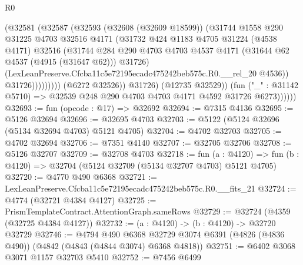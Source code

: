 \begin{lexlean}{R0}
\begin{coremodule}
                              (@32581
                                (@32587
                                  (@32593
                                    (@32608 (@32609 @18599))
                                    (@31744
                                      @1558
                                      @290
                                      @31225
                                      @4703
                                      @32516
                                      @4171
                                      (@31732
                                        @424
                                        @1183
                                        @4705
                                        @31224
                                        (@4538 @4171)
                                        @32516
                                        (@31744
                                          @284
                                          @290
                                          @4703
                                          @4703
                                          @4537
                                          @4171
                                          (@31644 @62 @4537 (@4915 (@31647 @62)))
                                          @31726)
                                        (LexLeanPreserve.Cfcba11c5e72195ecadc475242beb575c.R0.__rel_20
                                          @4536))
                                      @31726)))))))))
                    (@6272 @32526))
                  @31726)
                (@12735 @32529))
              (fun ("_" : @31142 @5710) =>
              @32539 @248 @290 @4703 @4703 @4171 @4592 @31726 @6273))))))
@32693 := fun (opcode : @17) => @32692
@32694 := @7315 @4136
@32695 := @5126 @32694
@32696 := @32695 @4703
@32703 := @5122 (@5124 @32696 (@5134 @32694 @4703) @5121 @4705)
@32704 := @4702 @32703
@32705 := @4702 @32694
@32706 := @7351 @4140
@32707 := @32705 @32706
@32708 := @5126 @32707
@32709 := @32708 @4703
@32718 := fun (a : @4120) =>
  fun (b : @4120) => @32704 (@5124 @32709 (@5134 @32707 @4703) @5121 @4705)
@32720 := @4770 @490 @6368
@32721 := LexLeanPreserve.Cfcba11c5e72195ecadc475242beb575c.R0.__fits_21
@32724 := @4774 (@32721 @4384 @4127)
@32725 := PrismTemplateContract.AttentionGraph.sameRows
@32729 := @32724 (@4359 (@32725 @4384 @4127))
@32732 := (a : @4120) -> (b : @4120) -> @32720 @32729
@32746 := @4794
    @490
    @6368
    @32729
    @3074
    @6391
    (@4826 (@4836 @490))
    (@4842 (@4843 (@4844 @3074) @6368 @4818))
@32751 := @6402 @3068 @3071 @1157 @32703 @5410
@32752 := @7456 @6499

\end{coremodule}
\end{lexlean}
